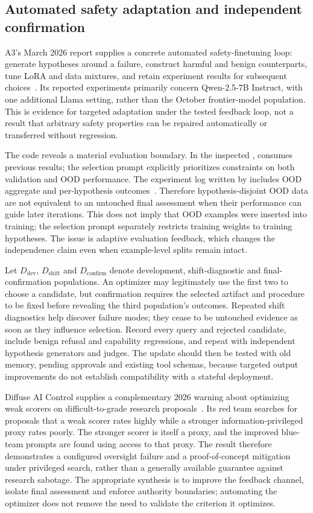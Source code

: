 \subsection{Automated safety adaptation and independent confirmation}\label{sec:C29:automatedalignment2026}
A3's March 2026 report supplies a concrete automated safety-finetuning loop: generate hypotheses around a failure, construct harmful and benign counterparts, tune LoRA and data mixtures, and retain experiment results for subsequent choices~\cite{zhang2026a3}. Its reported experiments primarily concern Qwen-2.5-7B Instruct, with one additional Llama setting, rather than the October frontier-model population. This is evidence for targeted adaptation under the tested feedback loop, not a result that arbitrary safety properties can be repaired automatically or transferred without regression.

The code reveals a material evaluation boundary. In the inspected ,  consumes previous results; the selection prompt explicitly prioritizes constraints on both validation and OOD performance. The experiment log written by  includes OOD aggregate and per-hypothesis outcomes~\cite{a32026code}. Therefore hypothesis-disjoint OOD data are not equivalent to an untouched final assessment when their performance can guide later iterations. This does not imply that OOD examples were inserted into training; the selection prompt separately restricts training weights to training hypotheses. The issue is adaptive evaluation feedback, which changes the independence claim even when example-level splits remain intact.

Let $D_{\mathrm{dev}}$, $D_{\mathrm{shift}}$ and $D_{\mathrm{confirm}}$ denote development, shift-diagnostic and final-confirmation populations. An optimizer may legitimately use the first two to choose a candidate, but confirmation requires the selected artifact and procedure to be fixed before revealing the third population's outcomes. Repeated shift diagnostics help discover failure modes; they cease to be untouched evidence as soon as they influence selection. Record every query and rejected candidate, include benign refusal and capability regressions, and repeat with independent hypothesis generators and judges. The update should then be tested with old memory, pending approvals and existing tool schemas, because targeted output improvements do not establish compatibility with a stateful deployment.

Diffuse AI Control supplies a complementary 2026 warning about optimizing weak scorers on difficult-to-grade research proposals~\cite{terekhov2026diffuse}. Its red team searches for proposals that a weak scorer rates highly while a stronger information-privileged proxy rates poorly. The stronger scorer is itself a proxy, and the improved blue-team prompts are found using access to that proxy. The result therefore demonstrates a configured oversight failure and a proof-of-concept mitigation under privileged search, rather than a generally available guarantee against research sabotage. The appropriate synthesis is to improve the feedback channel, isolate final assessment and enforce authority boundaries; automating the optimizer does not remove the need to validate the criterion it optimizes.
